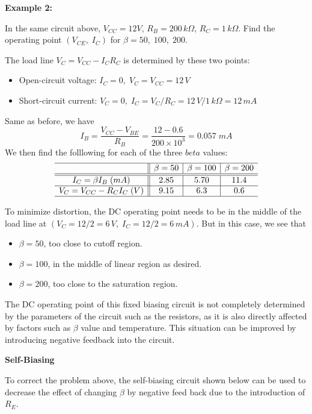 \documentclass{article}
\begin{document}
{\bf Example 2:} 

In the same circuit above, $V_{CC}=12V$, $R_B=200\,k\Omega$, 
$R_C=1\,k\Omega$. Find the operating point $(V_{CE},\;I_C)$ for 
$\beta=50,\;100,\; 200$.

The load line $V_C=V_{CC}-I_C R_C$ is determined by these two points:
\begin{itemize}
\item Open-circuit voltage: $I_C=0,\; V_C=V_{CC}=12\,V$
\item Short-circuit current: $V_C=0,\; I_C=V_C/R_C=12\,V/1\,k\Omega=12\,mA$
\end{itemize}
Same as before, we have
\begin{equation} 
I_B=\frac{V_{CC}-V_{BE}}{R_B}=\frac{12-0.6}{200\times 10^3}=0.057 \;mA 
\end{equation}
We then find the folllowing for each of the three $beta$ values:
\begin{equation}
\begin{array}{c||c|c|c}\hline
          & \beta=50 & \beta=100 & \beta=200 \\\hline\hline
I_C=\beta I_B\;(mA) &  2.85    &  5.70     &  11.4 \\\hline
V_C=V_{CC}-R_CI_C\;(V)  & 9.15     &  6.3      &  0.6 \\\hline
\end{array}
\end{equation}

To minimize distortion, the DC operating point needs to be in the 
middle of the load line at $(V_C=12/2=6\,V,\;I_C=12/2=6\,mA)$. But
in this case, we see that
\begin{itemize}
\item  $\beta=50$, too close to cutoff region.
\item  $\beta=100$, in the middle of linear region as desired.
\item  $\beta=200$, too close to the saturation region.
\end{itemize}

The DC operating point of this fixed biasing circuit is not 
completely determined by the parameters of the circuit such as 
the resistors, as it is also directly affected by factors such 
as $\beta$ value and temperature. This situation can be improved 
by introducing negative feedback into the circuit.


{\bf Self-Biasing} 

To correct the problem above, the self-biasing circuit shown below 
can be used to decrease the effect of changing $\beta$ by negative 
feed back due to the introduction of $R_E$.
\end{document}
